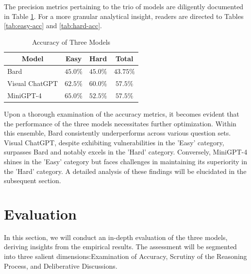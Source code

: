 \documentclass[journal,10pt]{IEEEtran}
\begin{document}
The precision metrics pertaining to the trio of models are diligently documented in Table \ref{tab:accuracy}. For a more granular analytical insight, readers are directed to Tables \ref{tab:easy-acc} and \ref{tab:hard-acc}.
\begin{table}[h]
    \centering
    \caption{Accuracy of Three Models}
    \label{tab:accuracy}
    \begin{tabular}{@{}lccc@{}}
    \toprule
    \multicolumn{1}{c}{Model} & Easy      & Hard & Total \\ \midrule
    Bard                      &  $45.0\%$ & $45.0\%$ &  $43.75\%$ \\
    Visual ChatGPT            &  $62.5\%$ & $60.0\%$ &  $57.5\%$  \\
    MiniGPT-4                 &  $65.0\%$ & $52.5\%$ &  $57.5\%$  \\ \bottomrule
    \end{tabular}
\end{table}

Upon a thorough examination of the accuracy metrics, it becomes evident that the performance of the three models necessitates further optimization. Within this ensemble, Bard consistently underperforms across various question sets. Visual ChatGPT, despite exhibiting vulnerabilities in the 'Easy' category, surpasses Bard and notably excels in the 'Hard' category. Conversely, MiniGPT-4 shines in the 'Easy' category but faces challenges in maintaining its superiority in the 'Hard' category. A detailed analysis of these findings will be elucidated in the subsequent section.

\section{Evaluation}
In this section, we will conduct an in-depth evaluation of the three models, deriving insights from the empirical results. The assessment will be segmented into three salient dimensions:Examination of Accuracy, Scrutiny of the Reasoning Process, and Deliberative Discussions.
\end{document}
